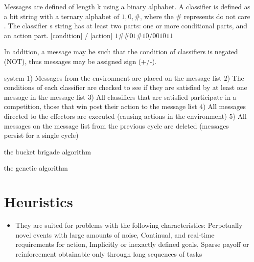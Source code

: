 \documentclass[a4paper, 11pt]{article}
\begin{document}
Messages are defined of length k using a binary alphabet. A classifier is defined as a bit string with a ternary alphabet of ${1, 0, \#}$, where the $\#$ represents do not care . The classifier s string has at least two parts: one or more conditional parts, and an action part. 
[condition] / [action] $1\#\#01\#10/001011$

In addition, a message may be such that the condition of classifiers is negated (NOT), thus messages may be assigned sign (+/-).

system
1) Messages from the environment are placed on the message list 2) The conditions of each classifier are checked to see if they are satisfied by at least one message in the message list 3) All classifiers that are satisfied participate in a competition, those that win post their action to the message list 4) All messages directed to the effectors are executed (causing actions in the environment) 5) All messages on the message list from the previous cycle are deleted (messages persist for a single cycle)

the bucket brigade algorithm

the genetic algorithm


\section{Heuristics}
\label{sec:heuristics}
\begin{itemize}
	\item They are suited for problems with the following characteristics: Perpetually novel events with large amounts of noise, Continual, and real-time requirements for action, Implicitly or inexactly defined goals, Sparse payoff or reinforcement obtainable only through long sequences of tasks
\end{itemize}

\end{document}
